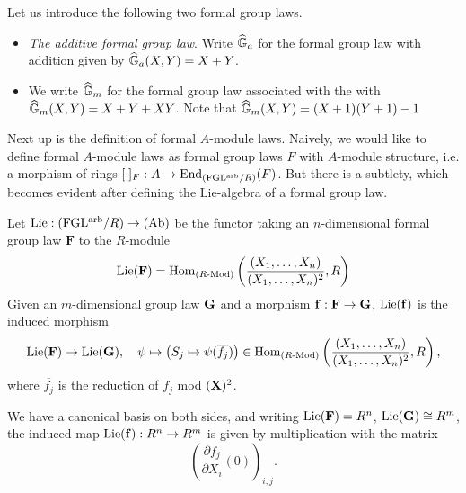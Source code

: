 \begin{xpl} Let us introduce the following two formal group laws.
  \begin{itemize}
    \item \textit{The additive formal group law}. Write 
      $\widehat{\mathbb{G}}_a$ for the formal group law with addition given by 
      $\widehat{\mathbb{G}}_a(X,Y) = X + Y$. 
    \item We write $\widehat{\mathbb{G}}_m$ for the formal group law associated with the 
      with $\widehat{\mathbb{G}}_m(X,Y) = X + Y + XY$. Note that $\widehat{\mathbb{G}}_m(X,Y) = (X+1)(Y+1) - 1$
  \end{itemize}
\end{xpl}

Next up is the definition of formal $A$-module laws. Naively, we would like to 
define formal $A$-module laws as formal group laws $F$
with $A$-module structure, i.e. a morphism of rings $[\cdot]_F: A \to
\operatorname{End}_{(\mathrm{FGL^{arb}}/{R})}(F)$. But there is a subtlety, which becomes evident after defining
the Lie-algebra of a formal group law. 
\begin{defi}
Let $\operatorname{Lie}: {(\mathrm{FGL^{arb}}/{R})} \to {(\mathrm{Ab})}$ be the functor taking an $n$-dimensional 
formal group law $\mathbf F$ to the $R$-module
\begin{equation*}
  \operatorname{Lie}(\mathbf{F}) = \operatorname{Hom}_{{({R}\text-\mathrm{Mod})}} \left( \frac{(X_1, \dots, X_n)}{(X_1, \dots,
  X_n)^2}, R \right) 
\end{equation*}
Given an $m$-dimensional group law $\mathbf{G}$ and a morphism $\mathbf f: \mathbf{F} \to
\mathbf{G}$, $\operatorname{Lie}(\mathbf{f})$ is the induced morphism
\begin{equation*}
  \operatorname{Lie}(\mathbf{F}) \to \operatorname{Lie}(\mathbf{G}), \quad \psi \mapsto \left( S_j \mapsto \psi
  (\overline{f_j})\right) \in 
  \operatorname{Hom}_{({R}\text-\mathrm{Mod})}\left(\frac{(X_1, \dots, X_n)}{(X_1, \dots, X_n)^2}, R \right),
\end{equation*}
where $\overline{ f_j}$ is the reduction of $f_j$ mod $(\mathbf{X})^2$. 
\end{defi}
We have a canonical basis on both sides, and writing $\operatorname{Lie}(\mathbf{F}) = R^n$, 
$\operatorname{Lie}(\mathbf{G}) \cong R^m$, the induced map $\operatorname{Lie}(\mathbf{f}) : R^n \to R^m$ is
given by multiplication with the matrix 
\begin{equation*}
  \left( \frac {\partial f_j}{\partial X_i} (0) \right)_{i,j}.
\end{equation*}

